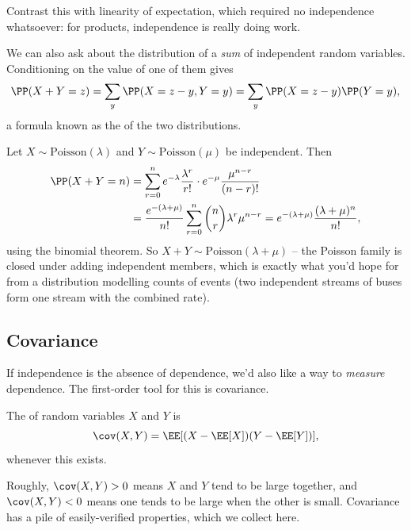 Contrast this with linearity of expectation, which required no independence whatsoever: for products, independence is really doing work.

We can also ask about the distribution of a \emph{sum} of independent random variables. Conditioning on the value of one of them gives
$$
\PP(X + Y = z) = \sum_y \PP(X = z - y, Y = y) = \sum_{y} \PP(X = z - y)\PP(Y = y),
$$
a formula known as the  of the two distributions.

\begin{example}
	Let $X \sim \mathrm{Poisson}(\lambda)$ and $Y \sim \mathrm{Poisson}(\mu)$ be independent. Then
	\begin{align*}
		\PP(X + Y = n) &= \sum_{r = 0}^{n} e^{-\lambda}\frac{\lambda^r}{r!} \cdot e^{-\mu}\frac{\mu^{n - r}}{(n-r)!} \\
		&= \frac{e^{-(\lambda + \mu)}}{n!} \sum_{r = 0}^{n} \binom{n}{r}\lambda^r \mu^{n - r} = e^{-(\lambda + \mu)}\frac{(\lambda + \mu)^n}{n!},
	\end{align*}
	using the binomial theorem. So $X + Y \sim \mathrm{Poisson}(\lambda + \mu)$ -- the Poisson family is closed under adding independent members, which is exactly what you'd hope for from a distribution modelling counts of events (two independent streams of buses form one stream with the combined rate).
\end{example}

\subsection{Covariance}

If independence is the absence of dependence, we'd also like a way to \emph{measure} dependence. The first-order tool for this is covariance.

\begin{definition}[Covariance]
	The  of random variables $X$ and $Y$ is
	$$
	\cov(X, Y) = \EE[(X - \EE[X])(Y - \EE[Y])],
	$$
	whenever this exists.
\end{definition}

Roughly, $\cov(X, Y) > 0$ means $X$ and $Y$ tend to be large together, and $\cov(X, Y) < 0$ means one tends to be large when the other is small. Covariance has a pile of easily-verified properties, which we collect here.


